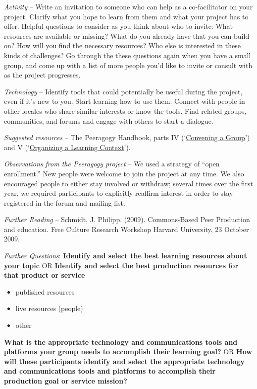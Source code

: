 \emph{Activity} -- Write an invitation to someone who can help as a
co-facilitator on your project. Clarify what you hope to learn from them
and what your project has to offer. Helpful questions to consider as you
think about who to invite: What resources are available or missing? What
do you already have that you can build on? How will you find the
necessary resources? Who else is interested in these kinds of
challenges? Go through the these questions again when you have a small
group, and come up with a list of more people you'd like to invite or
consult with as the project progresses.

\emph{Technology} -- Identify tools that could potentially be useful
during the project, even if it's new to you. Start learning how to use
them. Connect with people in other locales who share similar interests
or know the tools. Find related groups, communities, and forums and
engage with others to start a dialogue.

\emph{Suggested resources} -- The Peeragogy Handbook, parts IV
(`\href{http://peeragogy.org/convening-a-group/}{Convening a Group}')
and V
(`\href{http://peeragogy.org/organizing-a-learning-context/}{Organizing
a Learning Context}').

\emph{Observations from the Peeragogy project} -- We used a strategy of
``open enrollment.'' New people were welcome to join the project at any
time. We also encouraged people to either stay involved or withdraw;
several times over the first year, we required participants to
explicitly reaffirm interest in order to stay registered in the forum
and mailing list.

\emph{Further Reading} -- Schmidt, J. Philipp. (2009). Commons-Based
Peer Production and education. Free Culture Research Workshop Harvard
University, 23 October 2009.

\emph{Further Questions}: \textbf{Identify and select the best learning
resources about your topic} OR \textbf{Identify and select the best
production resources for that product or service}

\begin{itemize}
\tightlist
\item
  published resources
\item
  live resources (people)
\item
  other
\end{itemize}

\textbf{What is the appropriate technology and communications tools and
platforms your group needs to accomplish their learning goal?} OR
\textbf{How will these participants identify and select the appropriate
technology and communications tools and platforms to accomplish their
production goal or service mission?}

